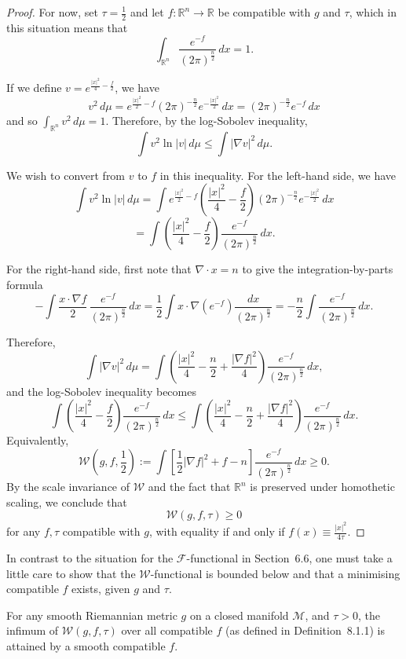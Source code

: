 \begin{proof}
For now, set $\tau=\frac12$ and let $f:\mathbb R^n\to\mathbb R$ be compatible
with $g$ and $\tau$, which in this situation means that
\[
\int_{\mathbb R^n} \frac{e^{-f}}{(2\pi)^{\frac n2}}\,dx = 1.
\]

If we define $v=e^{\frac{|x|^2}{4}-\frac f2}$, we have
\[
v^2\,d\mu
= e^{\frac{|x|^2}{2}-f}(2\pi)^{-\frac n2}e^{-\frac{|x|^2}{2}}\,dx
= (2\pi)^{-\frac n2}e^{-f}\,dx
\]
and so $\int_{\mathbb R^n} v^2\,d\mu=1$. Therefore, by the log-Sobolev
inequality,
\[
\int v^2\ln|v|\,d\mu \le \int |\nabla v|^2\,d\mu.
\]

We wish to convert from $v$ to $f$ in this inequality. For the left-hand side,
we have
\[
\int v^2\ln|v|\,d\mu
= \int e^{\frac{|x|^2}{2}-f}\left(\frac{|x|^2}{4}-\frac f2\right)
(2\pi)^{-\frac n2}e^{-\frac{|x|^2}{2}}\,dx
\]
\[
= \int \left(\frac{|x|^2}{4}-\frac f2\right)\frac{e^{-f}}{(2\pi)^{\frac n2}}\,dx.
\]

For the right-hand side, first note that $\nabla\cdot x=n$ to give the
integration-by-parts formula
\[
-\int \frac{x\cdot\nabla f}{2}\,\frac{e^{-f}}{(2\pi)^{\frac n2}}\,dx
= \frac12 \int x\cdot\nabla\!\left(e^{-f}\right)\frac{dx}{(2\pi)^{\frac n2}}
= -\frac n2 \int \frac{e^{-f}}{(2\pi)^{\frac n2}}\,dx.
\]

Therefore,
\[
\int |\nabla v|^2\,d\mu
= \int \left(\frac{|x|^2}{4}-\frac n2+\frac{|\nabla f|^2}{4}\right)
\frac{e^{-f}}{(2\pi)^{\frac n2}}\,dx,
\]
and the log-Sobolev inequality becomes
\[
\int \left(\frac{|x|^2}{4} - \frac{f}{2}\right)\frac{e^{-f}}{(2\pi)^{\frac{n}{2}}}\,dx
\leq
\int \left(\frac{|x|^2}{4} - \frac{n}{2} + \frac{|\nabla f|^2}{4}\right)\frac{e^{-f}}{(2\pi)^{\frac{n}{2}}}\,dx.
\]
Equivalently,
\[
\mathcal W\!\left(g,f,\frac{1}{2}\right)
:=
\int \left[\frac{1}{2}|\nabla f|^2 + f - n\right]\frac{e^{-f}}{(2\pi)^{\frac{n}{2}}}\,dx
\geq 0.
\]
By the scale invariance of $\mathcal W$ and the fact that $\mathbb R^n$ is
preserved under homothetic scaling, we conclude that
\[
\mathcal W(g,f,\tau)\geq 0
\]
for any $f,\tau$ compatible with $g$, with equality if and only if
$f(x)\equiv \frac{|x|^2}{4\tau}$.
\end{proof}

In contrast to the situation for the $\mathcal F$-functional in Section~6.6,
one must take a little care to show that the $\mathcal W$-functional is
bounded below and that a minimising compatible $f$ exists, given $g$ and
$\tau$.

\begin{lemma}
\label{topping-ch8-minimiser-exists}
For any smooth Riemannian metric $g$ on a closed manifold $\mathcal M$, and
$\tau>0$, the infimum of $\mathcal W(g,f,\tau)$ over all compatible $f$ (as
defined in Definition~8.1.1) is attained by a smooth compatible $f$.
\end{lemma}

